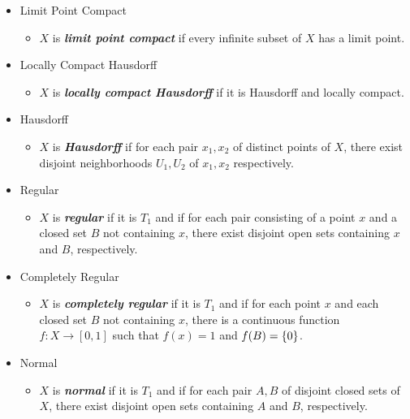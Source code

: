 \documentclass[12pt,a4paper]{article}
\begin{document}
\begin{itemize}
        \item Limit Point Compact
        \begin{itemize}
            \item $X$ is \textbf{\textit{limit point compact}} if every infinite subset of $X$ has a limit point.
        \end{itemize}
    
        \item Locally Compact Hausdorff
        \begin{itemize}
            \item $X$ is \textbf{\textit{locally compact Hausdorff}} if it is Hausdorff and locally compact.
        \end{itemize}
    
        \item Hausdorff
        \begin{itemize}
            \item $X$ is \textbf{\textit{Hausdorff}} if for each pair $x_1,x_2$ of distinct points of $X$, there exist disjoint neighborhoods $U_1, U_2$ of $x_1,x_2$ respectively.
        \end{itemize}
    
        \item Regular
        \begin{itemize}
            \item $X$ is \textbf{\textit{regular}} if it is $T_1$ and if for each pair consisting of a point $x$ and a closed set $B$ not containing $x$, there exist disjoint open sets containing $x$ and $B$, respectively.
        \end{itemize}
    
        \item Completely Regular
        \begin{itemize}
            \item $X$ is \textbf{\textit{completely regular}} if it is $T_1$ and if for each point $x$ and each closed set $B$ not containing $x$, there is a continuous function $f:X\to [0,1]$ such that $f(x)=1$ and $f(B)=\left\{0\right\}$.
        \end{itemize}
    
        \item Normal
        \begin{itemize}
            \item $X$ is \textbf{\textit{normal}} if it is $T_1$ and if for each pair $A,B$ of disjoint closed sets of $X$, there exist disjoint open sets containing $A$ and $B$, respectively.
        \end{itemize}
    

\end{itemize}
\end{document}
